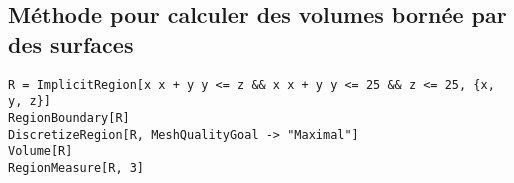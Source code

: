 \subsection{Méthode pour calculer des volumes bornée par des surfaces}
		\begin{flushleft}
			\verb|R = ImplicitRegion[x x + y y <= z && x x + y y <= 25 && z <= 25, {x, y, z}]|\\
			\verb|RegionBoundary[R]|\\
			\verb|DiscretizeRegion[R, MeshQualityGoal -> "Maximal"]|\\
			\verb|Volume[R]|\\
			\verb|RegionMeasure[R, 3]|
		\end{flushleft}	